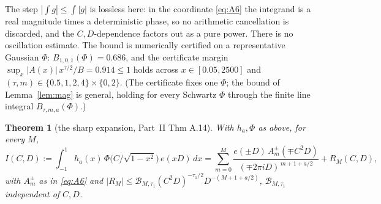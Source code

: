 \documentclass[11pt]{article}
\newtheorem{theorem}{Theorem}
\theoremstyle{definition}
\begin{document}
The step $|\int g|\le\int|g|$ is lossless here: in the coordinate \eqref{eq:A6} the integrand is a
real magnitude times a deterministic phase, so no arithmetic cancellation is discarded, and the
$C,D$-dependence factors out as a pure power. There is no oscillation estimate. The bound is
numerically certified on a representative Gaussian $\Phi$: $B_{1,0,1}(\Phi)=0.686$, and the certificate
margin $\sup_x |A(x)|\,x^{\tau/2}/B=0.914\le1$ holds across $x\in[0.05,2500]$ and
$(\tau,m)\in\{0.5,1,2,4\}\times\{0,2\}$. (The certificate fixes one $\Phi$; the bound of
Lemma~\ref{lem:mag} is general, holding for every Schwartz $\Phi$ through the finite line integral
$B_{\tau,m,a}(\Phi)$.)

\begin{theorem}[the sharp expansion, Part~II Thm A.14]\label{thm:A14}
With $h_a,\Phi$ as above, for every $M$,
\[
  I(C,D):=\int_{-1}^{1}h_a(x)\,\Phi\!\big(C/\sqrt{1-x^2}\big)\,e(xD)\,dx
  =\sum_{m=0}^{M}\frac{e(\pm D)\,A^{\pm}_m(\mp C^2D)}{(\mp 2\pi iD)^{\,m+1+a/2}}+R_M(C,D),
\]
with $A^\pm_m$ as in \eqref{eq:A6} and $|R_M|\le\mathcal B_{M,\tau_1}(C^2D)^{-\tau_1/2}
D^{-(M+1+a/2)}$, $\mathcal B_{M,\tau_1}$ independent of $C,D$.
\end{theorem}
\end{document}
